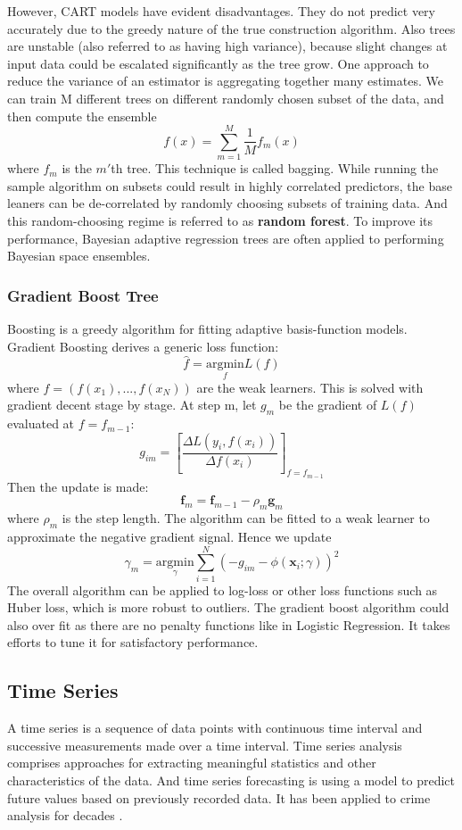 \documentclass[11pt,conference]{IEEEtran}
\begin{document}
However, CART models have evident disadvantages. They do not predict very accurately due to the greedy nature of the true construction algorithm. Also trees are unstable (also referred to as having high variance), because slight changes at input data could be escalated significantly as the tree grow. One approach to reduce the variance of an estimator is aggregating together many estimates. We can train M different trees on different randomly chosen subset of the data, and then compute the ensemble $$f(x) = \sum_{m=1}^{M}{\frac{1}{M}f_m(x)}$$ where $f_m$ is the $m'$th tree. This technique is called bagging. While running the sample algorithm on subsets could result in highly correlated predictors, the base leaners can be de-correlated by randomly choosing subsets of training data. And this random-choosing regime is referred to as \textbf{random forest}. To improve its performance, Bayesian adaptive regression trees are often applied to performing Bayesian space ensembles.\\

\subsubsection{Gradient Boost Tree}
Boosting is a greedy algorithm for fitting adaptive basis-function models. Gradient Boosting derives a generic loss function: $$\hat{f}=\underset{f}{\mathrm{argmin}} L(f)$$ where $f=(f(x_1),...,f(x_N))$ are the weak learners. This is solved with gradient decent stage by stage. At step m, let $g_m$ be the gradient of $L(f)$ evaluated at $f=f_{m-1}$:
$$g_{im} = {[\frac{\Delta L(y_i, f(x_i))}{\Delta f(x_i)}]}_{f=f_{m-1}}$$ 
Then the update is made: $$\textbf{f}_m = \textbf{f}_{m-1} - {\rho}_m \textbf{g}_m$$ where ${\rho}_m$ is the step length. The algorithm can be fitted to a weak learner to approximate the negative gradient signal. Hence we update 
$${\gamma}_m = \underset{\gamma}{\mathrm{argmin}} \sum_{i=1}^N{(-g_{im} - \phi (\textbf{x}_i;\gamma))^2}$$ The overall algorithm can be applied to log-loss or other loss functions such as Huber loss, which is more robust to outliers. The gradient boost algorithm could also over fit as there are no penalty functions like in Logistic Regression. It takes efforts to tune it for satisfactory performance.\\

\subsection{Time Series}
A time series is a sequence of data points with continuous time interval and successive measurements made over a time interval. Time series analysis comprises approaches for extracting meaningful statistics and other characteristics of the data. And time series forecasting is using a model to predict future values based on previously recorded data. It has been applied to crime analysis for decades \cite{3}.
\end{document}
